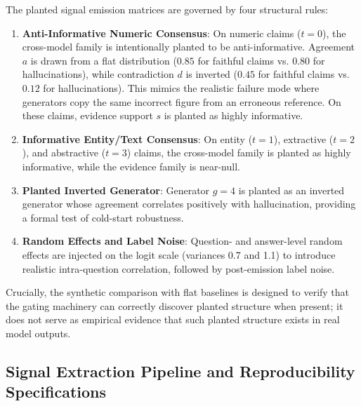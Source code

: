 \documentclass[pdflatex,sn-mathphys,Numbered]{sn-jnl}
\begin{document}
The planted signal emission matrices are governed by four structural rules:
\begin{enumerate}
    \item \textbf{Anti-Informative Numeric Consensus}: On numeric claims ($t=0$), the cross-model family is intentionally planted to be anti-informative. Agreement $a$ is drawn from a flat distribution ($0.85$ for faithful claims vs. $0.80$ for hallucinations), while contradiction $d$ is inverted ($0.45$ for faithful claims vs. $0.12$ for hallucinations). This mimics the realistic failure mode where generators copy the same incorrect figure from an erroneous reference. On these claims, evidence support $s$ is planted as highly informative.
    \item \textbf{Informative Entity/Text Consensus}: On entity ($t=1$), extractive ($t=2$), and abstractive ($t=3$) claims, the cross-model family is planted as highly informative, while the evidence family is near-null.
    \item \textbf{Planted Inverted Generator}: Generator $g=4$ is planted as an inverted generator whose agreement correlates positively with hallucination, providing a formal test of cold-start robustness.
    \item \textbf{Random Effects and Label Noise}: Question- and answer-level random effects are injected on the logit scale (variances 0.7 and 1.1) to introduce realistic intra-question correlation, followed by post-emission label noise.
\end{enumerate}

Crucially, the synthetic comparison with flat baselines is designed to verify that the gating machinery can correctly discover planted structure when present; it does not serve as empirical evidence that such planted structure exists in real model outputs.

\subsection{Signal Extraction Pipeline and Reproducibility Specifications}\label{subsec:signal_pipeline}
\end{document}

